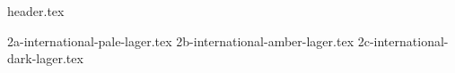 \clearpage
{}
\divisorLine
{header.tex}
\begin{multicols*}{2}
{2a-international-pale-lager.tex}
{2b-international-amber-lager.tex}
{2c-international-dark-lager.tex}
\end{multicols*}